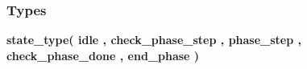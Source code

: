 \subsubsection*{Types}
 \begin{DoxyCompactItemize}
\item 
{\bfseries {\bf state\+\_\+type}{\bfseries \textcolor{vhdlchar}{(}\textcolor{vhdlchar}{ }\textcolor{vhdlchar}{idle}\textcolor{vhdlchar}{ }\textcolor{vhdlchar}{,}\textcolor{vhdlchar}{ }\textcolor{vhdlchar}{check\+\_\+phase\+\_\+step}\textcolor{vhdlchar}{ }\textcolor{vhdlchar}{,}\textcolor{vhdlchar}{ }\textcolor{vhdlchar}{phase\+\_\+step}\textcolor{vhdlchar}{ }\textcolor{vhdlchar}{,}\textcolor{vhdlchar}{ }\textcolor{vhdlchar}{check\+\_\+phase\+\_\+done}\textcolor{vhdlchar}{ }\textcolor{vhdlchar}{,}\textcolor{vhdlchar}{ }\textcolor{vhdlchar}{end\+\_\+phase}\textcolor{vhdlchar}{ }\textcolor{vhdlchar}{)}\textcolor{vhdlchar}{ }}} 
\end{DoxyCompactItemize}
